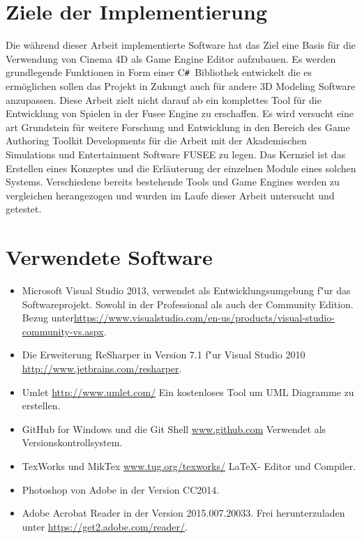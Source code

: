 \documentclass[pagesize, paper=a4, fontsize=12pt,titlepage=true, headings=small, headnosepline, abstractoff, liststotoc, nochapterprefix, plainheadsepline, twoside]{scrreprt}
\newcommand{\CSS}{C\texttt{\# }}
\begin{document}
\section{Ziele der Implementierung}
Die während dieser Arbeit implementierte Software hat das Ziel eine Basis für die Verwendung von Cinema 4D als Game Engine Editor aufzubauen. Es werden grundlegende Funktionen in Form einer \CSS Bibliothek entwickelt die es ermöglichen sollen das Projekt in Zukungt auch für andere 3D Modeling Software anzupassen. Diese Arbeit zielt nicht darauf ab ein komplettes Tool für die Entwicklung von Spielen in der Fusee Engine zu erschaffen. Es wird versucht eine art Grundstein für weitere Forschung und Entwicklung in den Bereich des Game Authoring Toolkit Developments für die Arbeit mit der Akademischen Simulations und Entertainment Software FUSEE zu legen. Das Kernziel ist das Erstellen eines Konzeptes und die Erläuterung der einzelnen Module eines solchen Systems. Verschiedene bereits bestehende Tools und Game Engines werden zu vergleichen herangezogen und wurden im Laufe dieser Arbeit untersucht und getestet.
\section{Verwendete Software}
\begin{itemize}
\item Microsoft Visual Studio 2013, \newline verwendet als Entwicklungsumgebung f"ur das Softwareprojekt. Sowohl in der Professional als auch der Community Edition. Bezug unter\url{https://www.visualstudio.com/en-us/products/visual-studio-community-vs.aspx}.
\item Die Erweiterung ReSharper in Version 7.1 f"ur Visual Studio 2010 \url{http://www.jetbrains.com/resharper}.
\item Umlet \url{http://www.umlet.com/} \newline Ein kostenloses Tool um UML Diagramme zu erstellen.
\item GitHub for Windows und die Git Shell \url{www.github.com} \newline Verwendet als Versionskontrollsystem.
\item TexWorks und MikTex \url{www.tug.org/texworks/} \newline \LaTeX- Editor und Compiler.
\item Photoshop von Adobe in der Version CC2014.
\item Adobe Acrobat Reader in der Version 2015.007.20033. Frei herunterzuladen unter \url{https://get2.adobe.com/reader/}.
\end{itemize}
\end{document}
